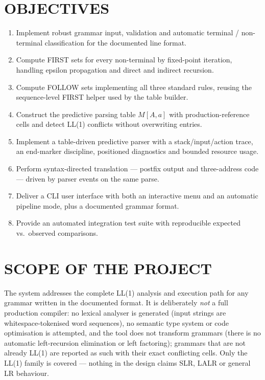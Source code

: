 \documentclass[12pt,a4paper,oneside,openany]{report}
\begin{document}
\section{OBJECTIVES}
\begin{enumerate}
  \item Implement robust grammar input, validation and automatic terminal /
        non-terminal classification for the documented line format.
  \item Compute FIRST sets for every non-terminal by fixed-point iteration,
        handling epsilon propagation and direct and indirect recursion.
  \item Compute FOLLOW sets implementing all three standard rules, reusing
        the sequence-level FIRST helper used by the table builder.
  \item Construct the predictive parsing table $M[A,a]$ with
        production-reference cells and detect LL(1) conflicts without
        overwriting entries.
  \item Implement a table-driven predictive parser with a stack/input/action
        trace, an end-marker discipline, positioned diagnostics and bounded
        resource usage.
  \item Perform syntax-directed translation --- postfix output and
        three-address code --- driven by parser events on the same parse.
  \item Deliver a CLI user interface with both an interactive menu and an
        automatic pipeline mode, plus a documented grammar format.
  \item Provide an automated integration test suite with reproducible
        expected vs.\ observed comparisons.
\end{enumerate}

\section{SCOPE OF THE PROJECT}
The system addresses the complete LL(1) analysis and execution path for any
grammar written in the documented format. It is deliberately \emph{not} a
full production compiler: no lexical analyser is generated (input strings
are whitespace-tokenised word sequences), no semantic type system or code
optimisation is attempted, and the tool does not transform grammars (there
is no automatic left-recursion elimination or left factoring); grammars
that are not already LL(1) are reported as such with their exact
conflicting cells. Only the LL(1) family is covered --- nothing in the
design claims SLR, LALR or general LR behaviour.
\end{document}
